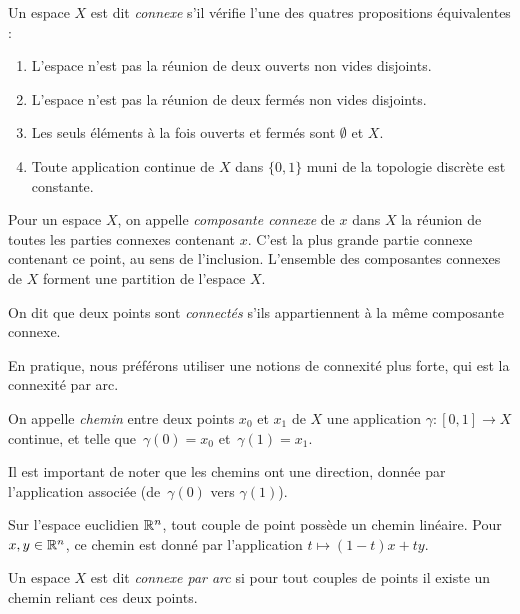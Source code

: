 \begin{definition}
Un espace $X$ est dit \emph{connexe} s'il vérifie l'une des quatres propositions équivalentes : \begin{enumerate}
    \item L'espace n'est pas la réunion de deux ouverts non vides disjoints.
    \item L'espace n'est pas la réunion de deux fermés non vides disjoints.
    \item Les seuls éléments à la fois ouverts et fermés sont $\emptyset$ et $X$.
    \item Toute application continue de $X$ dans $\{0,1\}$ muni de la topologie discrète est constante.
\end{enumerate}

Pour un espace $X$, on appelle \emph{composante connexe} de $x$ dans $X$ la réunion de toutes les parties connexes contenant $x$. C'est la plus grande partie connexe contenant ce point, au sens de l'inclusion. L'ensemble des composantes connexes de $X$ forment une partition de l'espace $X$.

On dit que deux points sont \emph{connectés} s'ils appartiennent à la même composante connexe.
\end{definition}

En pratique, nous préférons utiliser une notions de connexité plus forte, qui est la connexité par arc.

\begin{definition}\label{def:path}
On appelle \emph{chemin} entre deux points $x_0$ et $x_1$ de $X$ une application $\gamma:[0,1]\to X$ continue, et telle que~$\gamma(0)=x_0$ et~$\gamma(1)=x_1$.
\end{definition}

\begin{remark}
Il est important de noter que les chemins ont une direction, donnée par l'application associée (de~$\gamma(0)$ vers $\gamma(1)$).
\end{remark}

\begin{exemple}
Sur l'espace euclidien $\mathbb{R}^n$, tout couple de point possède un chemin linéaire. Pour $x,y\in\mathbb{R}^n$, ce chemin est donné par l'application $t\mapsto (1-t)x+ty$.
\end{exemple}

\begin{definition}
Un espace $X$ est dit \emph{connexe par arc} si pour tout couples de points il existe un chemin reliant ces deux points.
\end{definition}


